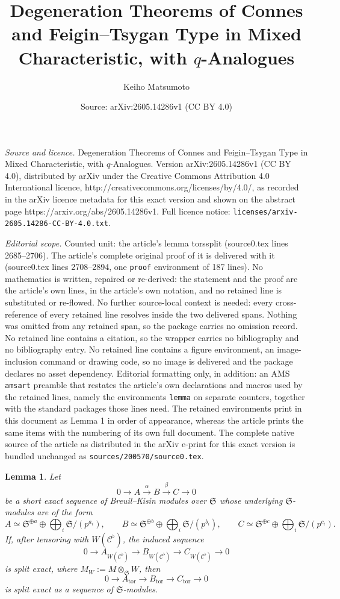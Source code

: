 \documentclass[10pt,a4paper]{amsart}
\title{Degeneration Theorems of Connes and Feigin--Tsygan Type in Mixed Characteristic, with \texorpdfstring{$q$}{q}-Analogues}
\author{Keiho Matsumoto}
\date{Source: arXiv:2605.14286v1 (CC BY 4.0)}
\newtheorem{lemma}{Lemma}
\newcommand{\mS}{\mf{S}}
\newcommand{\mf}{\mathfrak}
\newcommand{\sC}{\mathcal{C}}
\newcommand{\tors}{\operatorname{tor}}
\begin{document}
\maketitle

\noindent\emph{Source and licence.} Degeneration Theorems of Connes and Feigin--Tsygan Type in Mixed Characteristic, with \texorpdfstring{$q$}{q}-Analogues. Version arXiv:2605.14286v1 (CC BY 4.0), distributed by arXiv under the Creative Commons Attribution 4.0 International licence, http://creativecommons.org/licenses/by/4.0/, as recorded in the arXiv licence metadata for this exact version and shown on the abstract page https://arxiv.org/abs/2605.14286v1. Full licence notice: \texttt{licenses/arxiv-2605.14286-CC-BY-4.0.txt}.\par\smallskip

\noindent\textit{Editorial scope.} Counted unit: the article's lemma torssplit (source0.tex lines 2685--2706). The article's complete original proof of it is delivered with it (source0.tex lines 2708--2894, one \texttt{proof} environment of 187 lines). No mathematics is written, repaired or re-derived: the statement and the proof are the article's own lines, in the article's own notation, and no retained line is substituted or re-flowed.  No further source-local context is needed: every cross-reference of every retained line resolves inside the two delivered spans.  Nothing was omitted from any retained span, so the package carries no omission record.  No retained line contains a citation, so the wrapper carries no bibliography and no bibliography entry.  No retained line contains a figure environment, an image-inclusion command or drawing code, so no image is delivered and the package declares no asset dependency.  Editorial formatting only, in addition: an AMS \texttt{amsart} preamble that restates the article's own declarations and macros used by the retained lines, namely the environments \texttt{lemma} on separate counters, together with the standard packages those lines need.  The retained environments print in this document as Lemma 1 in order of appearance, whereas the article prints the same items with the numbering of its own full document.  The complete native source of the article as distributed in the arXiv e-print for this exact version is bundled unchanged as \texttt{sources/200570/source0.tex}.
\begin{lemma}\label{torssplit}
 Let
\[
  0\to A \xrightarrow{\alpha} B \xrightarrow{\beta} C\to 0
\]
be a short exact sequence of Breuil--Kisin modules over $\mS$ whose underlying $\mS$-modules are of the form
\[
  A\simeq \mS^{\oplus a}\oplus  \bigoplus_i \mS/(p^{a_i}),\qquad
  B\simeq \mS^{\oplus b}\oplus \bigoplus_i \mS/(p^{b_i}),\qquad
  C\simeq \mS^{\oplus c}\oplus \bigoplus_i \mS/(p^{c_i}).
\]
If, after tensoring with $W(\sC^\flat)$, the
induced sequence
\[
  0\to A_{W(\sC^\flat)}\to B_{W(\sC^\flat)}\to C_{W(\sC^\flat)}\to 0
\]
is split exact, where $M_W:=M\otimes_{\mS}W$, then
\[
  0\to A_{\tors}\to B_{\tors}\to C_{\tors}\to 0
\]
is split exact as a sequence of $\mS$-modules.
\end{lemma}
\end{document}
